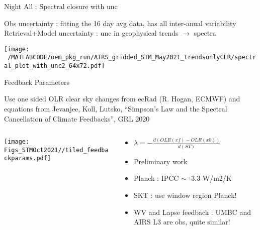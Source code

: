 \documentclass[10pt,t]{beamer}
\begin{document}
\begin{frame}{Night All : Spectral closure with unc}
\begin{footnotesize}
Obs uncertainty : fitting the 16 day avg data, has all inter-anual variability \newline
Retrieval+Model uncertainty : unc in geophysical trends $\rightarrow$ spectra \newline
\end{footnotesize}
\begin{center}
\texttt{[image: ~/MATLABCODE/oem\_pkg\_run/AIRS\_gridded\_STM\_May2021\_trendsonlyCLR/spectral\_plot\_with\_unc2\_64x72.pdf]}
\end{center}
\end{frame}

\begin{frame}{Feedback Parameters}

{\small 
Use one sided OLR clear sky changes from ecRad (R. Hogan, ECMWF) and equations from 
Jevanjee, Koll, Lutsko, ``Simpson's Law and the Spectral Cancellation of Climate Feedbacks'', GRL 2020}

\vspace{-0.25in}
\begin{columns}

\begin{column}{0.55\columnwidth}
\begin{block}{}
\vspace{-0.1in}
\begin{center}
\texttt{[image: Figs\_STMOct2021//tiled\_feedbackparams.pdf]}
\end{center}
\end{block}
\end{column}

\begin{column}{0.55\columnwidth}
\begin{block}{}
\begin{itemize}
\item $\lambda = -\frac{d(OLR(xf)-OLR(x0))}{d(ST)}$
\item Preliminary work
\item Planck : IPCC $\sim$ -3.3 W/m2/K
\item SKT : use window region Planck!
\item WV and Lapse feedback : UMBC and AIRS L3 are obs, quite similar!
\end{itemize}
\end{block}
\end{column}

\end{columns}
\end{frame}
\end{document}
